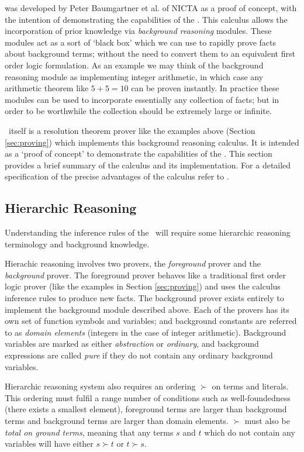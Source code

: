{\Beagle} was developed by Peter Baumgartner et al. of NICTA as a proof of concept,
with the intention of demonstrating the capabilities of the \emph{\HSWAC} \cite{baum13}. This
calculus allows the incorporation of prior knowledge via \emph{background reasoning} modules. 
These modules act as a sort of `black box' which we can use to rapidly prove
facts about background terms; without the need to convert them to an equivalent first order logic
formulation. As an example we may think of the background reasoning module
as implementing integer arithmetic, in which case any arithmetic theorem like $5+5=10$ can be proven instantly.
In practice these modules can be used to
incorporate essentially any collection of facts; but in order to be worthwhile
the collection should be extremely large or infinite.

\Beagle\ itself is a resolution theorem prover like the examples above (Section \ref{sec:proving})
which implements this background reasoning calculus. It is intended as a `proof of concept' to
demonstrate the capabilities of the \HSWAC. This section provides a brief
summary of the calculus and its implementation. For a detailed specification
of the precise advantages of the calculus refer to \cite{baum13}.

\subsection{Hierarchic Reasoning}
\label{sec:hier}

Understanding the inference rules of the \HSWAC\ will require some hierarchic reasoning
terminology and background knowledge.

Hierachic reasoning involves two provers, the \emph{foreground} prover and the
\emph{background} prover. The foreground prover behaves like a traditional first
order logic prover (like the examples in Section \ref{sec:proving}) and uses the
calculus inference rules to produce new facts. The background prover exists entirely
to implement the background module described above. Each of the provers has its own
set of function symbols and variables; and background constants are referred to as
\emph{domain elements} (integers in the case of integer arithmetic).
Background variables are marked as either
\emph{abstraction} or \emph{ordinary}, and background expressions are called \emph{pure} if
they do not contain any ordinary background variables.

Hierarchic reasoning system also requires an ordering $\succ$ on terms and literals. This ordering
must fulfil a range number of conditions such as well-foundedness (there exists a smallest element),
foreground terms are larger than background terms and background terms are larger than
domain elements. $\succ$ must also be \emph{total on ground terms}, meaning that
any terms $s$ and $t$ which do not contain any variables will have either $s \succ t$
or $t \succ s$.

